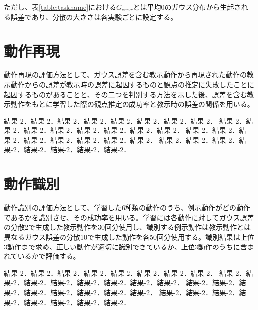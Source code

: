 ただし、表\ref{table:taskname}における$G_{error}$とは平均0のガウス分布から生起される誤差であり、分散の大きさは各実験ごとに設定する。


\section{動作再現}

動作再現の評価方法として、ガウス誤差を含む教示動作から再現された動作の教示動作からの誤差が教示時の誤差に起因するものと観点の推定に失敗したことに起因するものがあることと、その二つを判別する方法を示した後、誤差を含む教示動作をもとに学習した際の観点推定の成功率と教示時の誤差の関係を用いる。

結果-2．結果-2．結果-2．結果-2．結果-2．結果-2．結果-2．結果-2．
結果-2．結果-2．結果-2．結果-2．結果-2．結果-2．結果-2．結果-2．
結果-2．結果-2．結果-2．結果-2．結果-2．結果-2．結果-2．結果-2．
結果-2．結果-2．結果-2．結果-2．結果-2．結果-2．結果-2．結果-2．

\section{動作識別}

動作識別の評価方法として、学習した6種類の動作のうち、例示動作がどの動作であるかを識別させ、その成功率を用いる。学習には各動作に対してガウス誤差の分散2で生成した教示動作を30回分使用し、識別する例示動作は教示動作とは異なるガウス誤差の分散10で生成した動作を各50回分使用する。識別結果は上位3動作まで求め、正しい動作が適切に識別できているか、上位3動作のうちに含まれているかで評価する。

結果-2．結果-2．結果-2．結果-2．結果-2．結果-2．結果-2．結果-2．
結果-2．結果-2．結果-2．結果-2．結果-2．結果-2．結果-2．結果-2．
結果-2．結果-2．結果-2．結果-2．結果-2．結果-2．結果-2．結果-2．
結果-2．結果-2．結果-2．結果-2．結果-2．結果-2．結果-2．結果-2．

